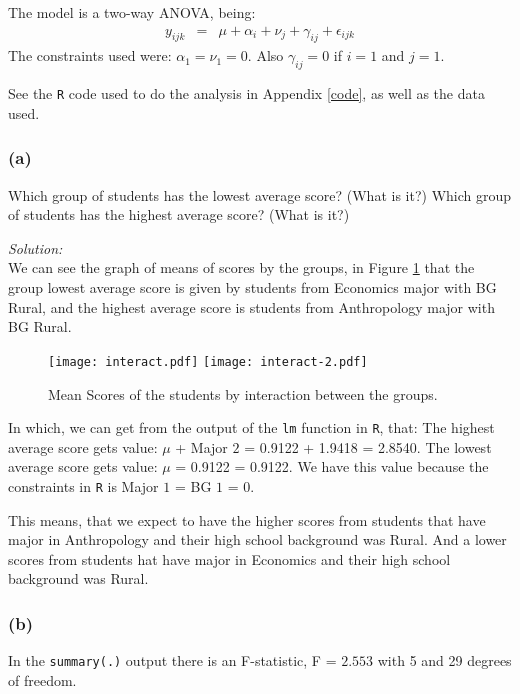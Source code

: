 \documentclass[a4paper, 11pt]{article}
\begin{document}
The model is a two-way ANOVA, being:
\begin{equation*}
\begin{array}{lclllll}
y_{ijk} & = & \mu + \alpha_i + \nu_j + \gamma_{ij} + \epsilon_{ijk}
\end{array}
\end{equation*}
The constraints used were: $\alpha_1 = \nu_1 = 0$. Also $\gamma_{ij} = 0$ if $i=1$ and $j=1$.

See the \texttt{R} code used to do the analysis in Appendix \ref{code}, as well as the data used.

\subsubsection*{(a)} 
Which group of students has the lowest average score? (What is it?) Which group
of students has the highest average score? (What is it?)

\noindent
\textit{Solution:}\\

We can see the graph of means of scores by the groups, in Figure \ref{int} that the group lowest average score is given by students from Economics major with BG Rural, and the highest average score is students from Anthropology major with BG Rural.
\begin{figure}[H]
\centering
\texttt{[image: interact.pdf]}
\texttt{[image: interact-2.pdf]}
\caption{Mean Scores of the students by interaction between the groups.}
\label{int}
\end{figure}

In which, we can get from the output of the \texttt{lm} function in \texttt{R}, that: The highest average score gets value: $\mu$ + Major $2$ = 0.9122 + 1.9418 =  2.8540. The lowest average score gets value: $\mu$ = 0.9122 = 0.9122. We have this value because the constraints in \texttt{R} is Major $1$ = BG $1$ = 0.

This means, that we expect to have the higher scores from students that have major in Anthropology and their high school background was Rural. And a lower scores from students hat have major in Economics and their high school background was Rural.

\subsubsection*{(b)} 
In the \texttt{summary(.)} output there is an F-statistic, F = $2.553$ with 5 and 29 degrees of freedom.
\end{document}
